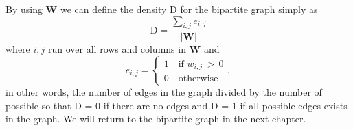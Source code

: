 By using $\textbf{W}$ we can define the density D for the bipartite graph simply as 
$$\text{D} = \frac{\sum_{i,j}e_{i,j}}{|\textbf{W}|}
$$
where $i,j$ run over all rows and columns in $\textbf{W}$ and
$$e_{i,j} =
    \left\{
        \begin{matrix}
            1\quad \text{if $w_{i,j}\, >\, 0$} \\
            0\quad \text{otherwise}
        \end{matrix}
    \right. ,
$$
in other words, the number of edges in the graph divided by the number of possible so that D = 0 if there are no edges and D = 1 if all possible edges exists in the graph. We will return to the bipartite graph in the next chapter.

